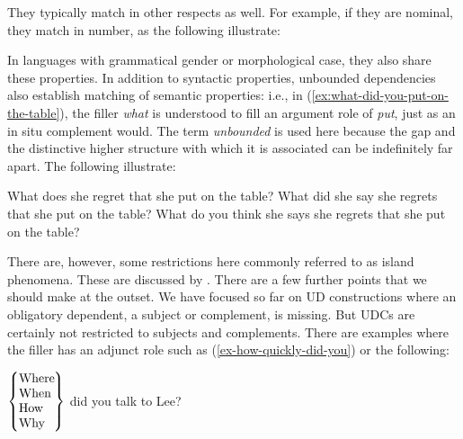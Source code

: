 \documentclass[output=paper
,notxmath 
 	        ,biblatex
                ,babelshorthands
                ,newtxmath
                ,draftmode
                ,colorlinks, citecolor=brown
]{langscibook}
\begin{document}
\noindent They typically match
in other respects as well. For example, if they are nominal, they
match in number, as the following illustrate:

\begin{exe}
  \ex \begin{xlist} \label{ex:UDC:4} 
      \end{xlist} \end{exe}

\noindent In languages with
grammatical gender or morphological case, they also share these
properties.  In addition to syntactic properties, unbounded
dependencies also establish matching of semantic properties: i.e.,
in (\ref{ex:what-did-you-put-on-the-table}), the filler \textit{what} is understood to
fill an argument role of \textit{put}, just as an in situ complement
would.  The term \emph{unbounded} is used here because the gap and the
distinctive higher structure with which it is associated can be
indefinitely far apart. The following illustrate:

\eal
\label{ex:UDC:5} 
\ex What does she regret that she put \trace{} on the table?
\ex What did she say she regrets that she put \trace{} on the table?
\ex What do you think she says she regrets that she put \trace{} on the table?
\zl

\noindent There are, however, some
restrictions here commonly referred to as island phenomena. These
are discussed by .  There are a few
further points that we should make at the outset. We have focused so
far on UD constructions where an obligatory dependent, a subject or
complement, is missing. But UDCs are certainly not restricted to
subjects and complements.  There are examples where the filler has
an adjunct role such as (\ref{ex-how-quickly-did-you}) or the following:

\ea
\label{ex:UDC:6}
$\begin{array}{@{}l@{}}
\left\{%
\begin{tabular}{@{}l@{}}
  Where\hspace{-.09em}\mbox{}\\
  When\\
  How\\
  Why\\
\end{tabular}\right\}
\end{array}$
did you talk to Lee\trace{}?
\z
\end{document}
